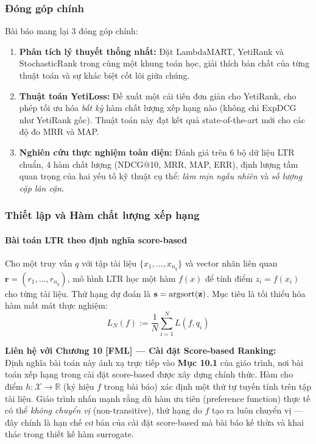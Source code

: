 \subsubsection{Đóng góp chính}
Bài báo mang lại 3 đóng góp chính:
\begin{enumerate}
  \item \textbf{Phân tích lý thuyết thống nhất:} Đặt LambdaMART, YetiRank và StochasticRank trong cùng một khung toán học, giải thích bản chất của từng thuật toán và sự khác biệt cốt lõi giữa chúng.
  \item \textbf{Thuật toán YetiLoss:} Đề xuất một cải tiến đơn giản cho YetiRank, cho phép tối ưu hóa \emph{bất kỳ} hàm chất lượng xếp hạng nào (không chỉ ExpDCG như YetiRank gốc). Thuật toán này đạt kết quả state-of-the-art mới cho các độ đo MRR và MAP.
  \item \textbf{Nghiên cứu thực nghiệm toàn diện:} Đánh giá trên 6 bộ dữ liệu LTR chuẩn, 4 hàm chất lượng (NDCG@10, MRR, MAP, ERR), định lượng tầm quan trọng của hai yếu tố kỹ thuật cụ thể: \emph{làm mịn ngẫu nhiên} và \emph{số lượng cặp lân cận}.
\end{enumerate}

\subsubsection{Thiết lập và Hàm chất lượng xếp hạng}

\paragraph{Bài toán LTR theo định nghĩa score-based}
Cho một truy vấn $q$ với tập tài liệu $\{x_1, \ldots, x_{n_q}\}$ và vector nhãn liên quan $\mathbf{r} = (r_1, \ldots, r_{n_q})$, mô hình LTR học một hàm $f(x)$ để tính điểm $z_i = f(x_i)$ cho từng tài liệu. Thứ hạng dự đoán là $\mathbf{s} = \arg\!\operatorname{sort}(\mathbf{z})$. Mục tiêu là tối thiểu hóa hàm mất mát thực nghiệm:
\[
  L_N(f) := \frac{1}{N} \sum_{i=1}^{N} L(f, q_i)
\]

\begin{lienhe_ly_thuyet}
  \textbf{Liên hệ với Chương 10 [FML] --- Cài đặt Score-based Ranking:} \\
  Định nghĩa bài toán này ánh xạ trực tiếp vào \textbf{Mục 10.1} của giáo trình, nơi bài toán xếp hạng trong cài đặt score-based được xây dựng chính thức. Hàm cho điểm $h: \mathcal{X} \to \mathbb{R}$ (ký hiệu $f$ trong bài báo) xác định một thứ tự tuyến tính trên tập tài liệu. Giáo trình nhấn mạnh rằng dù hàm ưu tiên (preference function) thực tế có thể \emph{không chuyển vị} (non-transitive), thứ hạng do $f$ tạo ra luôn chuyển vị --- đây chính là hạn chế cơ bản của cài đặt score-based mà bài báo kế thừa và khai thác trong thiết kế hàm surrogate.
\end{lienhe_ly_thuyet}

